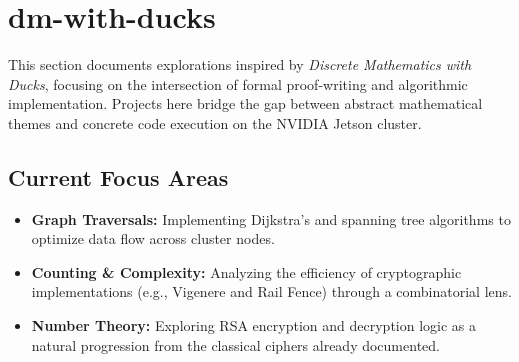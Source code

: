 \section{dm-with-ducks}
This section documents explorations inspired by \textit{Discrete Mathematics with Ducks}, focusing on the intersection of formal proof-writing and algorithmic implementation. Projects here bridge the gap between abstract mathematical themes and concrete code execution on the NVIDIA Jetson cluster.

\subsection*{Current Focus Areas}
\begin{itemize}
    \item \textbf{Graph Traversals:} Implementing Dijkstra's and spanning tree algorithms to optimize data flow across cluster nodes.
    \item \textbf{Counting \& Complexity:} Analyzing the efficiency of cryptographic implementations (e.g., Vigenere and Rail Fence) through a combinatorial lens.
    \item \textbf{Number Theory:} Exploring RSA encryption and decryption logic as a natural progression from the classical ciphers already documented.
\end{itemize}